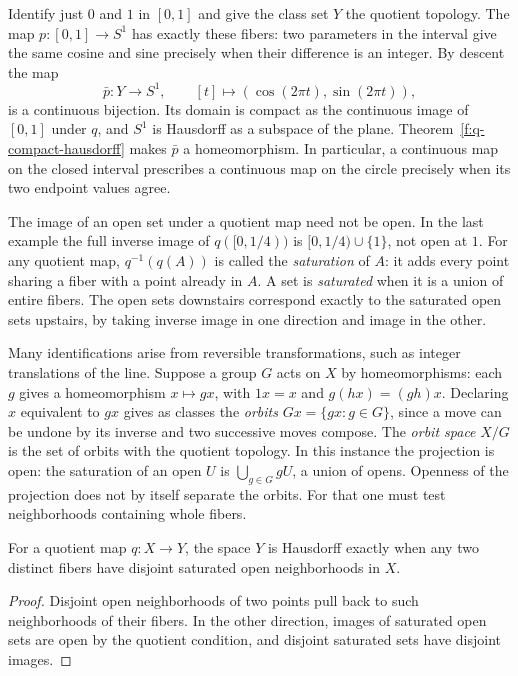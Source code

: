 \begin{example}\label{f:q-circle}
Identify just $0$ and $1$ in $[0,1]$ and give the class set $Y$ the quotient topology. The map $p:[0,1]\to S^1$ has exactly these fibers: two parameters in the interval give the same cosine and sine precisely when their difference is an integer. By descent the map
\[
 \bar p:Y\longrightarrow S^1,\qquad [t]\longmapsto(\cos(2\pi t),\sin(2\pi t)),
\]
is a continuous bijection. Its domain is compact as the continuous image of $[0,1]$ under $q$, and $S^1$ is Hausdorff as a subspace of the plane. Theorem~\ref{f:q-compact-hausdorff} makes $\bar p$ a homeomorphism. In particular, a continuous map on the closed interval prescribes a continuous map on the circle precisely when its two endpoint values agree.
\end{example}

The image of an open set under a quotient map need not be open. In the last example the full inverse image of $q([0,1/4))$ is $[0,1/4)\cup\{1\}$, not open at $1$. For any quotient map, $q^{-1}(q(A))$ is called the \emph{saturation} of $A$: it adds every point sharing a fiber with a point already in $A$. A set is \emph{saturated} when it is a union of entire fibers. The open sets downstairs correspond exactly to the saturated open sets upstairs, by taking inverse image in one direction and image in the other.

Many identifications arise from reversible transformations, such as integer translations of the line. Suppose a group $G$ acts on $X$ by homeomorphisms: each $g$ gives a homeomorphism $x\mapsto gx$, with $1x=x$ and $g(hx)=(gh)x$. Declaring $x$ equivalent to $gx$ gives as classes the \emph{orbits} $Gx=\{gx:g\in G\}$, since a move can be undone by its inverse and two successive moves compose. The \emph{orbit space} $X/G$ is the set of orbits with the quotient topology. In this instance the projection is open: the saturation of an open $U$ is $\bigcup_{g\in G}gU$, a union of opens. Openness of the projection does not by itself separate the orbits. For that one must test neighborhoods containing whole fibers.

\begin{proposition}\label{f:q-separated-fibers}
For a quotient map $q:X\to Y$, the space $Y$ is Hausdorff exactly when any two distinct fibers have disjoint saturated open neighborhoods in $X$.
\end{proposition}
\begin{proof}
Disjoint open neighborhoods of two points pull back to such neighborhoods of their fibers. In the other direction, images of saturated open sets are open by the quotient condition, and disjoint saturated sets have disjoint images.
\end{proof}

